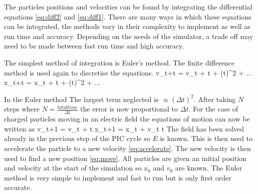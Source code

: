 The particles positions and velocities can be found by integrating the differential equations \eqref{eq:diff2} and \eqref{eq:diff1}. There are many ways in which these equations can be integrated, the methods vary in their complexity to implement as well as run time and accuracy. Depending on the needs of the simulator, a trade off may need to be made between fast run time and high accuracy. 

The simplest method of integration is Euler's method.
The finite difference method is used again to discretise the equations. 
\be 
v_{t+\Delta t} = v_t +  \Delta t +  {(\Delta t)}^2 + ...
\ee
\be 
x_{t+\Delta t} = x_t +  \Delta t +  {(\Delta t)}^2 + ...
\ee

In the Euler method The largest term neglected is $\propto {(\Delta t)}^2$. After taking $N$ steps where $N = \frac{total time}{\Delta t}$ the error is now proportional to $\Delta t$. For the case of charged particles moving in an electric field the equations of motion can now be written as
\be
v_{t+1} = v_t +  \Delta t
\label{eq:accelerate}
\ee
\be 
x_{t+1} = x_t + v_t \Delta t
\label{eq:move}
\ee 
The field has been solved already in the previous step of the PIC cycle so $E$ is known. This is then used to accelerate the particle to a new velocity \eqref{eq:accelerate}. The new velocity is then used to find a new position \eqref{eq:move}. All particles are given an initial position and velocity at the start of the simulation so $x_0$ and $v_0$ are known.  The Euler method is very simple to implement and fast to run but is only first order accurate.

